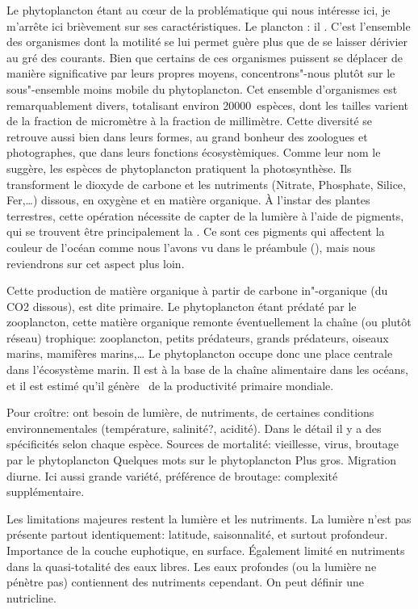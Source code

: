 Le phytoplancton étant au cœur de la problématique qui nous intéresse ici, je m'arrête ici brièvement sur ses caractéristiques.
Le plancton : il .
C'est l'ensemble des organismes dont la motilité se lui permet guère plus que de se laisser dérivier au gré des courants.
Bien que certains de ces organismes puissent se déplacer de manière significative par leurs propres moyens, concentrons"-nous plutôt sur le sous"-ensemble moins mobile du phytoplancton.
Cet ensemble d'organismes est remarquablement divers, totalisant environ \num{20 000}~espèces, dont les tailles varient de la fraction de micromètre à la fraction de millimètre. Cette diversité se retrouve aussi bien dans leurs formes, au grand bonheur des zoologues et photographes, que dans leurs fonctions écosystèmiques.
Comme leur nom le suggère, les espèces de phytoplancton pratiquent la photosynthèse.
Ils transforment le dioxyde de carbone et les nutriments (Nitrate, Phosphate, Silice, Fer,\dots) dissous, en oxygène et en matière organique.
À l'instar des plantes terrestres, cette opération nécessite de capter de la lumière à l'aide de pigments, qui se trouvent être principalement la .
Ce sont ces pigments qui affectent la couleur de l'océan comme nous l'avons vu dans le préambule (), mais nous reviendrons sur cet aspect plus loin.

Cette production de matière organique à partir de carbone in"-organique (du CO2 dissous), est dite primaire.
Le phytoplancton étant prédaté par le zooplancton, cette matière organique remonte éventuellement la chaîne (ou plutôt réseau) trophique: zooplancton, petits prédateurs, grands prédateurs, oiseaux marins, mamifères marins,\dots
Le phytoplancton occupe donc une place centrale dans l'écosystème marin.
Il est à la base de la chaîne alimentaire dans les océans, et il est estimé qu'il génère~ de la productivité primaire mondiale.

Pour croître: ont besoin de lumière, de nutriments, de certaines conditions environnementales (température, salinité?, acidité). Dans le détail il y a des spécificités selon chaque espèce.
Sources de mortalité: vieillesse, virus, broutage par le phytoplancton
Quelques mots sur le phytoplancton Plus gros. Migration diurne. Ici aussi grande variété, préférence de broutage: complexité supplémentaire.

Les limitations majeures restent la lumière et les nutriments.
La lumière n'est pas présente partout identiquement: latitude, saisonnalité, et surtout profondeur. Importance de la couche euphotique, en surface.
Également limité en nutriments dans la quasi-totalité des eaux libres. Les eaux profondes (ou la lumière ne pénètre pas) contiennent des nutriments cependant. On peut définir une nutricline.

